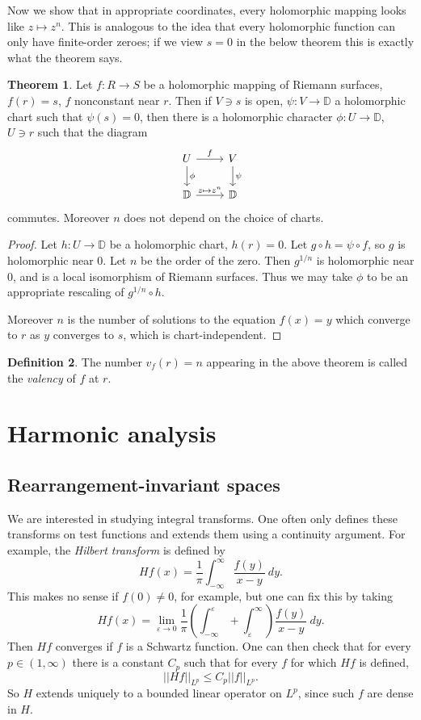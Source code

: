 \documentclass[12pt]{report}
\newcommand{\DD}{\mathbb{D}}
\newcommand{\dfn}[1]{\emph{#1}\index{#1}}
\theoremstyle{definition}
\newtheorem{theorem}{Theorem}[chapter]
\newtheorem{definition}[theorem]{Definition}
\begin{document}
Now we show that in appropriate coordinates, every holomorphic mapping looks like $z \mapsto z^n$.
This is analogous to the idea that every holomorphic function can only have finite-order zeroes; if we view $s = 0$ in the below theorem this is exactly what the theorem says.
\begin{theorem}
Let $f: R \to S$ be a holomorphic mapping of Riemann surfaces, $f(r) = s$, $f$ nonconstant near $r$.
Then if $V \ni s$ is open, $\psi: V \to \DD$ a holomorphic chart such that $\psi(s) = 0$, then there is a holomorphic character $\phi: U \to \DD$, $U \ni r$ such that the diagram
$$\begin{tikzcd} U \arrow[r,"f"] \arrow[d,"\phi"] & V \arrow[d,"\psi"]\\
\DD \arrow[r,"z \mapsto z^n"] & \DD
\end{tikzcd}$$
commutes. Moreover $n$ does not depend on the choice of charts.
\end{theorem}
\begin{proof}
Let $h: U \to \DD$ be a holomorphic chart, $h(r) = 0$. Let $g \circ h = \psi \circ f$, so $g$ is holomorphic near $0$.
Let $n$ be the order of the zero. Then $g^{1/n}$ is holomorphic near $0$, and is a local isomorphism of Riemann surfaces.
Thus we may take $\phi$ to be an appropriate rescaling of $g^{1/n} \circ h$.

Moreover $n$ is the number of solutions to the equation $f(x) = y$ which converge to $r$ as $y$ converges to $s$, which is chart-independent.
\end{proof}
\begin{definition}
The number $v_f(r) = n$ appearing in the above theorem is called the \dfn{valency} of $f$ at $r$.
\end{definition}





\part{Harmonic analysis}
\chapter{Rearrangement-invariant spaces}
We are interested in studying integral transforms. One often only defines these transforms on test functions and extends them using a continuity argument. For example, the \dfn{Hilbert transform} is defined by
$$Hf(x) = \frac{1}{\pi}\int_{-\infty}^\infty \frac{f(y)}{x-y}~dy.$$
This makes no sense if $f(0) \neq 0$, for example, but one can fix this by taking
$$Hf(x) = \lim_{\varepsilon \to 0} \frac{1}{\pi} \left(\int_{-\infty}^\varepsilon + \int_\varepsilon^\infty\right) \frac{f(y)}{x-y}~dy.$$
Then $Hf$ converges if $f$ is a Schwartz function. One can then check that for every $p \in (1, \infty)$ there is a constant $C_p$ such that for every $f$ for which $Hf$ is defined,
$$||Hf||_{L^p} \leq C_p ||f||_{L^p}.$$
So $H$ extends uniquely to a bounded linear operator on $L^p$, since such $f$ are dense in $H$.
\end{document}
